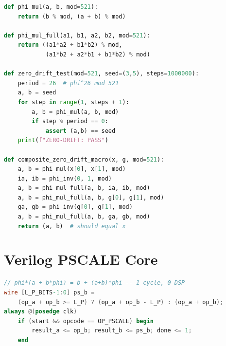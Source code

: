 \documentclass[conference]{IEEEtran}
\begin{document}
\begin{lstlisting}[language=Python]
def phi_mul(a, b, mod=521):
    return (b % mod, (a + b) % mod)

def phi_mul_full(a1, b1, a2, b2, mod=521):
    return ((a1*a2 + b1*b2) % mod,
            (a1*b2 + a2*b1 + b1*b2) % mod)

def zero_drift_test(mod=521, seed=(3,5), steps=1000000):
    period = 26  # phi^26 mod 521
    a, b = seed
    for step in range(1, steps + 1):
        a, b = phi_mul(a, b, mod)
        if step % period == 0:
            assert (a,b) == seed
    print(f"ZERO-DRIFT: PASS")

def composite_zero_drift_macro(x, g, mod=521):
    a, b = phi_mul(x[0], x[1], mod)
    ia, ib = phi_inv(0, 1, mod)
    a, b = phi_mul_full(a, b, ia, ib, mod)
    a, b = phi_mul_full(a, b, g[0], g[1], mod)
    ga, gb = phi_inv(g[0], g[1], mod)
    a, b = phi_mul_full(a, b, ga, gb, mod)
    return (a, b)  # should equal x
\end{lstlisting}

\section{Verilog PSCALE Core}

\begin{lstlisting}[language=Verilog]
// phi*(a + b*phi) = b + (a+b)*phi -- 1 cycle, 0 DSP
wire [L_P_BITS-1:0] ps_b =
    (op_a + op_b >= L_P) ? (op_a + op_b - L_P) : (op_a + op_b);
always @(posedge clk)
    if (start && opcode == OP_PSCALE) begin
        result_a <= op_b; result_b <= ps_b; done <= 1;
    end
\end{lstlisting}
\end{document}
